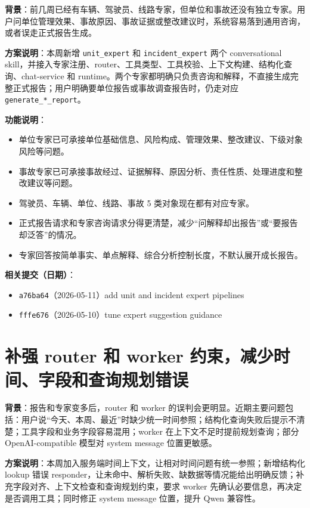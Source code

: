 \documentclass[UTF8]{ctexart}
\begin{document}
\textbf{背景}：前几周已经有车辆、驾驶员、线路专家，但单位和事故还没有独立专家。用户问单位管理效果、事故原因、事故证据或整改建议时，系统容易落到通用咨询，或者误走正式报告生成。

\textbf{方案说明}：本周新增 \texttt{unit\_expert} 和 \texttt{incident\_expert} 两个 conversational skill，并接入专家注册、router、工具类型、工具校验、上下文构建、结构化查询、chat-service 和 runtime。两个专家都明确只负责咨询和解释，不直接生成完整正式报告；用户明确要单位报告或事故调查报告时，仍走对应 \texttt{generate\_*\_report}。

\textbf{功能说明}：
\begin{itemize}
\item 单位专家已可承接单位基础信息、风险构成、管理效果、整改建议、下级对象风险等问题。
\item 事故专家已可承接事故经过、证据解释、原因分析、责任性质、处理进度和整改建议等问题。
\item 驾驶员、车辆、单位、线路、事故 5 类对象现在都有对应专家。
\item 正式报告请求和专家咨询请求分得更清楚，减少``问解释却出报告''或``要报告却泛答''的情况。
\item 专家回答按简单事实、单点解释、综合分析控制长度，不默认展开成长报告。
\end{itemize}

\textbf{相关提交（日期）}：
\begin{itemize}
\item \texttt{a76ba64}（2026-05-11）add unit and incident expert pipelines
\item \texttt{fffe676}（2026-05-10）tune expert suggestion guidance
\end{itemize}

\section{补强 router 和 worker 约束，减少时间、字段和查询规划错误}

\textbf{背景}：报告和专家变多后，router 和 worker 的误判会更明显。近期主要问题包括：用户说``今天、本周、最近''时缺少统一时间参照；结构化查询失败后提示不清楚；工具字段和业务字段容易混用；worker 在上下文不足时提前规划查询；部分 OpenAI-compatible 模型对 system message 位置更敏感。

\textbf{方案说明}：本周加入服务端时间上下文，让相对时间问题有统一参照；新增结构化 lookup 错误 responder，让未命中、解析失败、缺数据等情况能给出明确反馈；补充字段对齐、上下文检查和查询规划约束，要求 worker 先确认必要信息，再决定是否调用工具；同时修正 system message 位置，提升 Qwen 兼容性。
\end{document}
